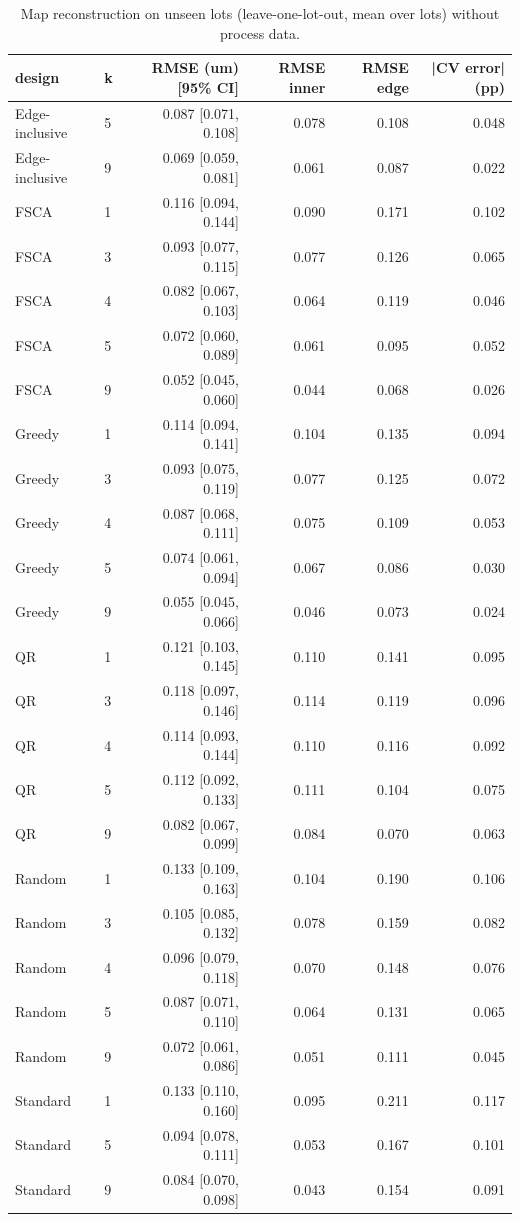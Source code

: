 \begin{table}[t]
\centering
\caption{Map reconstruction on unseen lots (leave-one-lot-out, mean over lots) without process data.}
\label{tab:sites}
\footnotesize
\begin{tabular}{llrrrr}
\toprule
design & k & RMSE (um) [95\% CI] & RMSE inner & RMSE edge & |CV error| (pp) \\
\midrule
Edge-inclusive & 5 & 0.087 [0.071, 0.108] & 0.078 & 0.108 & 0.048 \\
Edge-inclusive & 9 & 0.069 [0.059, 0.081] & 0.061 & 0.087 & 0.022 \\
FSCA & 1 & 0.116 [0.094, 0.144] & 0.090 & 0.171 & 0.102 \\
FSCA & 3 & 0.093 [0.077, 0.115] & 0.077 & 0.126 & 0.065 \\
FSCA & 4 & 0.082 [0.067, 0.103] & 0.064 & 0.119 & 0.046 \\
FSCA & 5 & 0.072 [0.060, 0.089] & 0.061 & 0.095 & 0.052 \\
FSCA & 9 & 0.052 [0.045, 0.060] & 0.044 & 0.068 & 0.026 \\
Greedy & 1 & 0.114 [0.094, 0.141] & 0.104 & 0.135 & 0.094 \\
Greedy & 3 & 0.093 [0.075, 0.119] & 0.077 & 0.125 & 0.072 \\
Greedy & 4 & 0.087 [0.068, 0.111] & 0.075 & 0.109 & 0.053 \\
Greedy & 5 & 0.074 [0.061, 0.094] & 0.067 & 0.086 & 0.030 \\
Greedy & 9 & 0.055 [0.045, 0.066] & 0.046 & 0.073 & 0.024 \\
QR & 1 & 0.121 [0.103, 0.145] & 0.110 & 0.141 & 0.095 \\
QR & 3 & 0.118 [0.097, 0.146] & 0.114 & 0.119 & 0.096 \\
QR & 4 & 0.114 [0.093, 0.144] & 0.110 & 0.116 & 0.092 \\
QR & 5 & 0.112 [0.092, 0.133] & 0.111 & 0.104 & 0.075 \\
QR & 9 & 0.082 [0.067, 0.099] & 0.084 & 0.070 & 0.063 \\
Random & 1 & 0.133 [0.109, 0.163] & 0.104 & 0.190 & 0.106 \\
Random & 3 & 0.105 [0.085, 0.132] & 0.078 & 0.159 & 0.082 \\
Random & 4 & 0.096 [0.079, 0.118] & 0.070 & 0.148 & 0.076 \\
Random & 5 & 0.087 [0.071, 0.110] & 0.064 & 0.131 & 0.065 \\
Random & 9 & 0.072 [0.061, 0.086] & 0.051 & 0.111 & 0.045 \\
Standard & 1 & 0.133 [0.110, 0.160] & 0.095 & 0.211 & 0.117 \\
Standard & 5 & 0.094 [0.078, 0.111] & 0.053 & 0.167 & 0.101 \\
Standard & 9 & 0.084 [0.070, 0.098] & 0.043 & 0.154 & 0.091 \\
\bottomrule
\end{tabular}
\end{table}
